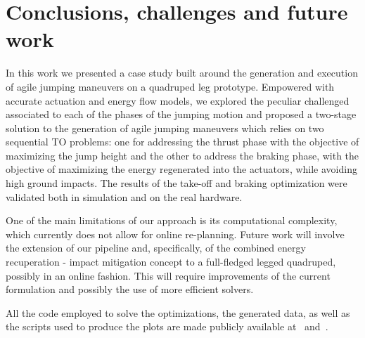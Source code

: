\section{Conclusions, challenges and future work}\label{sec:conclusions}
In this work we presented a case study built around the generation and execution of agile jumping maneuvers on a quadruped leg prototype.  
Empowered with accurate actuation and energy flow models, we explored the peculiar challenged associated to each of the phases of the jumping motion and proposed a two-stage solution to the generation of agile jumping maneuvers which relies on two sequential TO problems: one for addressing the thrust phase with the objective of maximizing the jump height and the other to address the braking phase, with the objective of maximizing the energy regenerated into the actuators, while avoiding high ground impacts. The results of the take-off and braking optimization were validated both in simulation and on the real hardware. 

One of the main limitations of our approach is its computational complexity, which currently does not allow for online re-planning. Future work will involve the extension of our pipeline and, specifically, of the combined energy recuperation - impact mitigation concept to a full-fledged legged quadruped, possibly in an online fashion. This will require improvements of the current formulation and possibly the use of more efficient solvers.  

All the code employed to solve the optimizations, the generated data, as well as the scripts used to produce the plots are made publicly available at~\cite{url::awesome_leg_repo} and~\cite{url::data_link}.